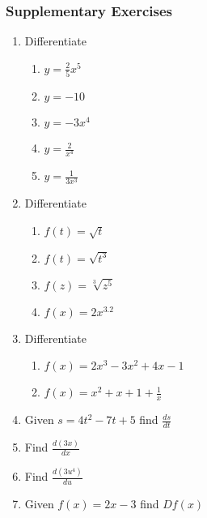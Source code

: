 \subsubsection{Supplementary Exercises}
\columnsep=30pt
\begin{multicols}{2}

\begin{enumerate}
\item Differentiate 


\begin{enumerate}
\item $y =\frac{2}{5} x^{5}$ 

\item $y = -10$ 

\item $y = -3 x^{4}$ 

\item $y =\frac{2}{x^{4}}$ 

\item $y =\frac{1}{3 x^{3}}$ \end{enumerate}


\item Differentiate 


\begin{enumerate}
\item $f (t) =\sqrt{t}$ 

\item $f (t) =\sqrt{t^{3}}$ 

\item $f (z) =\sqrt[{3}]{z^{5}}$ 

\item $f (x) =2 x^{3.2}$ \end{enumerate}


\item Differentiate 


\begin{enumerate}
\item $f (x) =2 x^{3} -3 x^{2} +4 x -1$ 

\item $f (x) =x^{2} +x +1 +\frac{1}{x}$ \end{enumerate}


\item Given $s =4 t^{2} -7 t +5$ find $\frac{d s}{d t}$ 

\item Find $\frac{d \left (3 x\right )}{d x}$ 

\item Find $\frac{d \left (3 u^{4}\right )}{d u}$ 

\item Given $f (x) =2 x -3$ find $D f (x)$ \end{enumerate}
\end{multicols}

